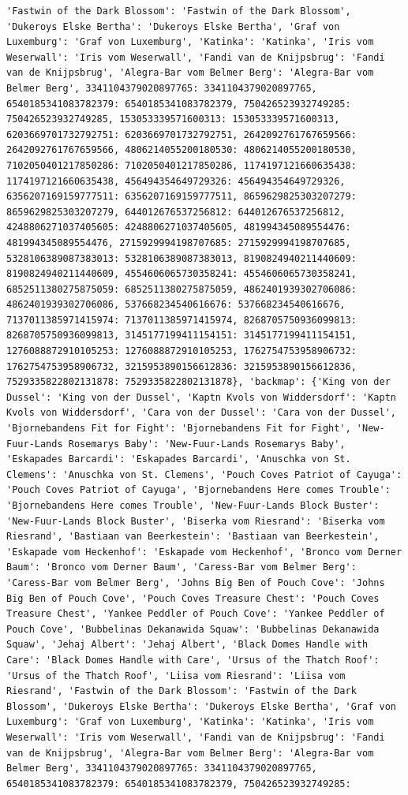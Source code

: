 \documentclass[
  letterpaper,
  DIV=11,
  numbers=noendperiod]{scrreprt}
\begin{document}
\begin{codelisting}
{\begin{verbatim}
'Fastwin of the Dark Blossom': 'Fastwin of the Dark Blossom', 'Dukeroys Elske Bertha': 'Dukeroys Elske Bertha', 'Graf von Luxemburg': 'Graf von Luxemburg', 'Katinka': 'Katinka', 'Iris vom Weserwall': 'Iris vom Weserwall', 'Fandi van de Knijpsbrug': 'Fandi van de Knijpsbrug', 'Alegra-Bar vom Belmer Berg': 'Alegra-Bar vom Belmer Berg', 3341104379020897765: 3341104379020897765, 6540185341083782379: 6540185341083782379, 750426523932749285: 750426523932749285, 153053339571600313: 153053339571600313, 6203669701732792751: 6203669701732792751, 2642092761767659566: 2642092761767659566, 4806214055200180530: 4806214055200180530, 7102050401217850286: 7102050401217850286, 1174197121660635438: 1174197121660635438, 456494354649729326: 456494354649729326, 6356207169159777511: 6356207169159777511, 8659629825303207279: 8659629825303207279, 644012676537256812: 644012676537256812, 4248806271037405605: 4248806271037405605, 481994345089554476: 481994345089554476, 2715929994198707685: 2715929994198707685, 5328106389087383013: 5328106389087383013, 8190824940211440609: 8190824940211440609, 4554606065730358241: 4554606065730358241, 6852511380275875059: 6852511380275875059, 4862401939302706086: 4862401939302706086, 537668234540616676: 537668234540616676, 7137011385971415974: 7137011385971415974, 8268705750936099813: 8268705750936099813, 3145177199411154151: 3145177199411154151, 1276088872910105253: 1276088872910105253, 1762754753958906732: 1762754753958906732, 3215953890156612836: 3215953890156612836, 7529335822802131878: 7529335822802131878}, 'backmap': {'King von der Dussel': 'King von der Dussel', 'Kaptn Kvols von Widdersdorf': 'Kaptn Kvols von Widdersdorf', 'Cara von der Dussel': 'Cara von der Dussel', 'Bjornebandens Fit for Fight': 'Bjornebandens Fit for Fight', 'New-Fuur-Lands Rosemarys Baby': 'New-Fuur-Lands Rosemarys Baby', 'Eskapades Barcardi': 'Eskapades Barcardi', 'Anuschka von St. Clemens': 'Anuschka von St. Clemens', 'Pouch Coves Patriot of Cayuga': 'Pouch Coves Patriot of Cayuga', 'Bjornebandens Here comes Trouble': 'Bjornebandens Here comes Trouble', 'New-Fuur-Lands Block Buster': 'New-Fuur-Lands Block Buster', 'Biserka vom Riesrand': 'Biserka vom Riesrand', 'Bastiaan van Beerkestein': 'Bastiaan van Beerkestein', 'Eskapade vom Heckenhof': 'Eskapade vom Heckenhof', 'Bronco vom Derner Baum': 'Bronco vom Derner Baum', 'Caress-Bar vom Belmer Berg': 'Caress-Bar vom Belmer Berg', 'Johns Big Ben of Pouch Cove': 'Johns Big Ben of Pouch Cove', 'Pouch Coves Treasure Chest': 'Pouch Coves Treasure Chest', 'Yankee Peddler of Pouch Cove': 'Yankee Peddler of Pouch Cove', 'Bubbelinas Dekanawida Squaw': 'Bubbelinas Dekanawida Squaw', 'Jehaj Albert': 'Jehaj Albert', 'Black Domes Handle with Care': 'Black Domes Handle with Care', 'Ursus of the Thatch Roof': 'Ursus of the Thatch Roof', 'Liisa vom Riesrand': 'Liisa vom Riesrand', 'Fastwin of the Dark Blossom': 'Fastwin of the Dark Blossom', 'Dukeroys Elske Bertha': 'Dukeroys Elske Bertha', 'Graf von Luxemburg': 'Graf von Luxemburg', 'Katinka': 'Katinka', 'Iris vom Weserwall': 'Iris vom Weserwall', 'Fandi van de Knijpsbrug': 'Fandi van de Knijpsbrug', 'Alegra-Bar vom Belmer Berg': 'Alegra-Bar vom Belmer Berg', 3341104379020897765: 3341104379020897765, 6540185341083782379: 6540185341083782379, 750426523932749285: 
\end{verbatim}}
\end{codelisting}
\end{document}
